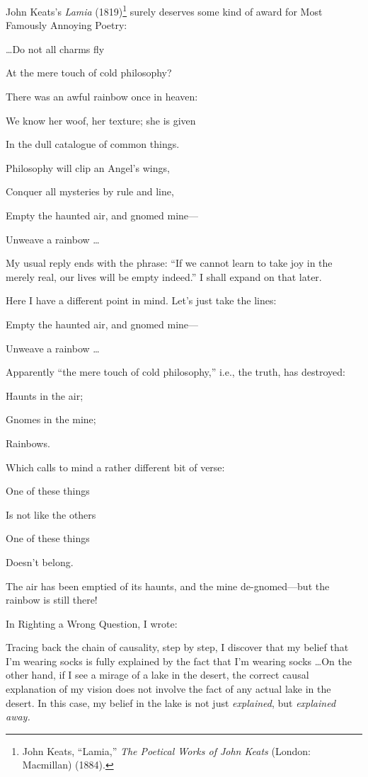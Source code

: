 
{
 John Keats's \textit{Lamia}
(1819)\footnote{John Keats, ``Lamia,''
\textit{The Poetical Works of John Keats} (London: Macmillan) (1884).} surely deserves some kind of award for Most
Famously Annoying Poetry:}

{
 \ldots Do not all charms fly}

{
 At the mere touch of cold philosophy?}

{
 There was an awful rainbow once in heaven:}

{
 We know her woof, her texture; she is given}

{
 In the dull catalogue of common things.}

{
 Philosophy will clip an Angel's wings,}

{
 Conquer all mysteries by rule and line,}

{
 Empty the haunted air, and gnomed mine---}

{
 Unweave a rainbow \ldots}

{
 My usual reply ends with the phrase: ``If we
cannot learn to take joy in the merely real, our lives will be empty
indeed.'' I shall expand on that later.}

{
 Here I have a different point in mind. Let's just
take the lines:}

{
 Empty the haunted air, and gnomed mine---}

{
 Unweave a rainbow \ldots}

{
 Apparently ``the mere touch of cold
philosophy,'' i.e., the truth, has destroyed:}

{
 Haunts in the air;}

{
 Gnomes in the mine;}

{
 Rainbows.}

{
 Which calls to mind a rather different bit of verse:}

{
 One of these things}

{
 Is not like the others}

{
 One of these things}

{
 Doesn't belong.}

{
 The air has been emptied of its haunts, and the mine
de-gnomed---but the rainbow is still there!}

{
 In Righting a Wrong Question, I wrote:}

{
 Tracing back the chain of causality, step by step, I discover that
my belief that I'm wearing socks is fully explained by
the fact that I'm wearing socks \ldots On the other
hand, if I see a mirage of a lake in the desert, the correct causal
explanation of my vision does not involve the fact of any actual lake
in the desert. In this case, my belief in the lake is not just
\textit{explained}, but \textit{explained away.}}


